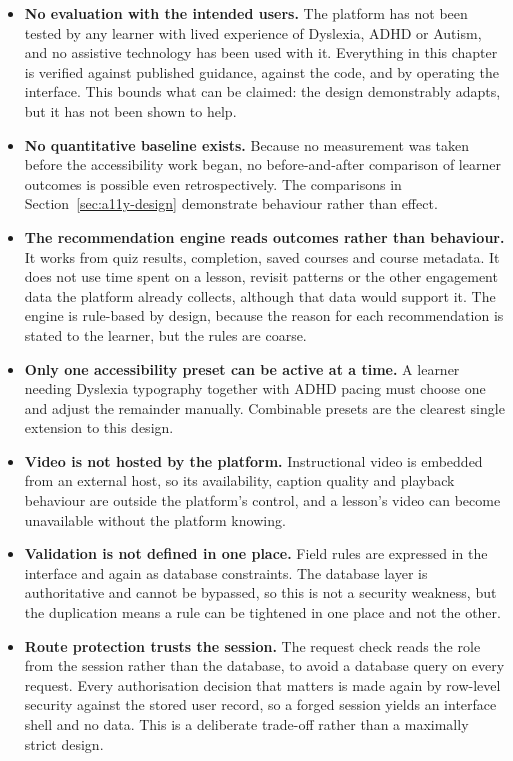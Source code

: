 \documentclass[12pt, oneside]{article} %
\begin{document}
\begin{itemize}
    \item \textbf{No evaluation with the intended users.} The platform has not been tested by any learner with lived experience of Dyslexia, ADHD or Autism, and no assistive technology has been used with it. Everything in this chapter is verified against published guidance, against the code, and by operating the interface. This bounds what can be claimed: the design demonstrably adapts, but it has not been shown to help.

    \item \textbf{No quantitative baseline exists.} Because no measurement was taken before the accessibility work began, no before-and-after comparison of learner outcomes is possible even retrospectively. The comparisons in Section~\ref{sec:a11y-design} demonstrate behaviour rather than effect.

    \item \textbf{The recommendation engine reads outcomes rather than behaviour.} It works from quiz results, completion, saved courses and course metadata. It does not use time spent on a lesson, revisit patterns or the other engagement data the platform already collects, although that data would support it. The engine is rule-based by design, because the reason for each recommendation is stated to the learner, but the rules are coarse.

    \item \textbf{Only one accessibility preset can be active at a time.} A learner needing Dyslexia typography together with ADHD pacing must choose one and adjust the remainder manually. Combinable presets are the clearest single extension to this design.

    \item \textbf{Video is not hosted by the platform.} Instructional video is embedded from an external host, so its availability, caption quality and playback behaviour are outside the platform's control, and a lesson's video can become unavailable without the platform knowing.

    \item \textbf{Validation is not defined in one place.} Field rules are expressed in the interface and again as database constraints. The database layer is authoritative and cannot be bypassed, so this is not a security weakness, but the duplication means a rule can be tightened in one place and not the other.

    \item \textbf{Route protection trusts the session.} The request check reads the role from the session rather than the database, to avoid a database query on every request. Every authorisation decision that matters is made again by row-level security against the stored user record, so a forged session yields an interface shell and no data. This is a deliberate trade-off rather than a maximally strict design.


\end{itemize}
\end{document}
